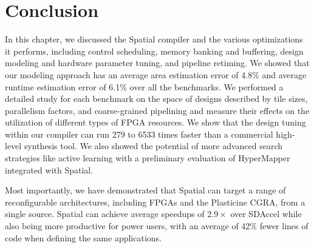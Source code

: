\section{Conclusion}

In this chapter, we discussed the Spatial compiler and the various optimizations
it performs, including control scheduling, memory banking and buffering,
design modeling and hardware parameter tuning, and pipeline retiming.
We showed that our modeling approach has an average area estimation
error of 4.8\% and average runtime estimation error of 6.1\% over all the benchmarks.
We performed a detailed study for each benchmark on the space of designs described by tile sizes, parallelism
factors, and coarse-grained pipelining and measure their effects on the utilization of different types of FPGA
resources. We show that the design tuning within our compiler can run 279 to 6533 times
faster than a commercial high-level synthesis tool. We also showed the potential of
more advanced search strategies like active learning with a preliminary evaluation
of HyperMapper integrated with Spatial.

Most importantly, we have demonstrated that Spatial can target a range of reconfigurable
architectures, including FPGAs and the Plasticine CGRA,
from a single source. Spatial can achieve average speedups
of $2.9\times$ over SDAccel while also being more productive for power users,
with an average of 42\% fewer lines of code when defining the same applications.
